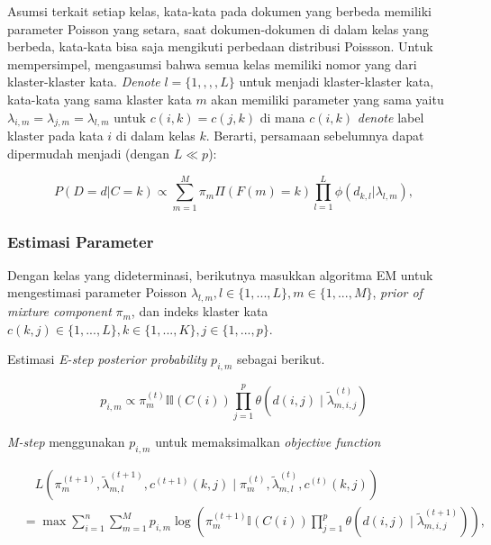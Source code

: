 Asumsi \cite{song2008autotag} terkait setiap kelas, kata-kata pada dokumen yang berbeda memiliki parameter Poisson yang setara, saat dokumen-dokumen di dalam kelas yang berbeda, kata-kata bisa saja mengikuti perbedaan distribusi Poissson. Untuk mempersimpel, \cite{song2008autotag} mengasumsi bahwa semua kelas memiliki nomor yang dari klaster-klaster kata. \textit{Denote} \(l = \{1,,,,L\}\) untuk menjadi klaster-klaster kata, kata-kata yang sama klaster kata \(m\) akan memiliki parameter yang sama yaitu \(\lambda_{i,m} = \lambda_{j,m} = \lambda_{l,m}\) untuk \(c(i,k) = c(j,k)\) di mana \(c(i,k)\) \textit{denote} label klaster pada kata \(i\) di dalam kelas \(k\). Berarti, persamaan sebelumnya dapat dipermudah menjadi (dengan $L \ll p$):

\begin{equation}
\label{poisson_mixture_model_2}
    P(D = d | C = k) \propto \sum_{m=1}^{M}\pi_m\Pi(F(m) = k) \prod_{l=1}^{L}\phi(d_{k,l}|\lambda_{l,m}),
\end{equation}

\subsubsection{Estimasi Parameter}

Dengan kelas yang dideterminasi, berikutnya masukkan algoritma EM untuk mengestimasi parameter Poisson \(\lambda_{l,m}, l \in \{1, ..., L\}, m \in \{1, ..., M\}\), \textit{prior of mixture component} \(\pi_m\), dan indeks klaster kata \(c(k,j) \in \{1, ..., L\},k \in \{1, ..., K\}, j \in \{1, ..., p\}\).

Estimasi \textit{E-step} \textit{posterior probability} \(p_{i,m}\) sebagai berikut.

\begin{equation}
\label{e_step}
p_{i, m} \propto \pi_{m}^{(t)} \mathbb{II}(C(i)) \prod_{j=1}^{p} \theta\left(d(i, j) \mid \tilde{\lambda}_{m, i, j}^{(t)}\right) 
\end{equation}

\textit{M-step} menggunakan \(p_{i,m}\) untuk memaksimalkan \textit{objective function}


\begin{equation}
\label{m_step}
\begin{aligned}
&\quad L\left(\pi_{m}^{(t+1)}, \tilde{\lambda}_{m, l}^{(t+1)}, c^{(t+1)}(k, j) \mid \pi_{m}^{(t)}, \tilde{\lambda}_{m, l}^{(t)}, c^{(t)}(k, j)\right) \\
&=\max \sum_{i=1}^{n} \sum_{m=1}^{M} p_{i, m} \log \left(\pi_{m}^{(t+1)} \mathbb{I}(C(i)) \prod_{j=1}^{p} \theta\left(d(i, j) \mid \tilde{\lambda}_{m, i, j}^{(t+1)}\right)\right),
\end{aligned}
\end{equation}


